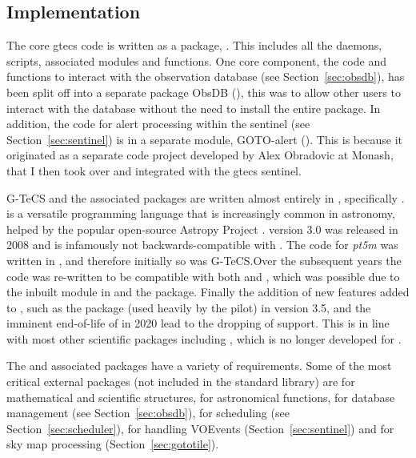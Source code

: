 \begin{colsection}
\begin{colsection}
\end{colsection}


\subsection{Implementation}
\label{sec:implementation}
\begin{colsection}

The core \gls{gtecs} code is written as a  package, . This includes all the daemons, scripts, associated modules and functions. One core component, the code and functions to interact with the observation database (see Section~\ref{sec:obsdb}), has been split off into a separate  package ObsDB (), this was to allow other users to interact with the database without the need to install the entire  package. In addition, the code for alert processing within the sentinel (see Section~\ref{sec:sentinel}) is in a separate module, GOTO-alert (). This is because it originated as a separate code project developed by Alex Obradovic at Monash, that I then took over and integrated with the \gls{gtecs} sentinel.

G-TeCS and the associated packages are written almost entirely in , specifically .  is a versatile programming language that is increasingly common in astronomy, helped by the popular open-source Astropy Project \citep{astropy}.  version 3.0 was released in 2008 and is infamously not backwards-compatible with . The code for \textit{pt5m} was written in , and therefore initially so was G-TeCS.\@ Over the subsequent years the code was re-written to be compatible with both  and , which was possible due to the inbuilt  module in  and the  package. Finally the addition of new features added to , such as the  package (used heavily by the pilot) in version 3.5, and the imminent end-of-life of  in 2020 lead to the dropping of  support. This is in line with most other scientific  packages including , which is no longer developed for . %

The  and associated packages have a variety of requirements. Some of the most critical external packages (not included in the  standard library) are  for mathematical and scientific structures,  for astronomical functions,  for  database management (see Section~\ref{sec:obsdb}),  for scheduling (see Section~\ref{sec:scheduler}),  for handling VOEvents (Section~\ref{sec:sentinel}) and  for sky map processing (Section~\ref{sec:gototile}).


\end{colsection}
\end{colsection}
